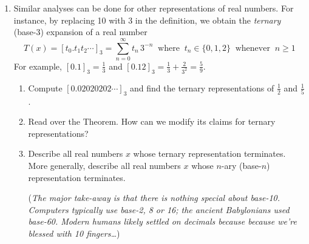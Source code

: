 \begin{exercises*}{}
\begin{enumerate}
		\item Similar analyses can be done for other representations of real numbers. For instance, by replacing 10 with 3 in the definition, we obtain the \emph{ternary} (base-3) expansion of a real number
		\[
			T(x) =[t_0.t_1t_2\cdots]_3
			=\sum_{n=0}^\infty t_n\,3^{-n}
			\ \text{ where }\ 
			t_n\in\{0,1,2\}
			\ \text{ whenever }\
			n\ge 1
		\]
		For example, $[0.1]_3=\frac 13$ and $[0.12]_3=\frac 13+\frac 2{3^2}=\frac 59$.
		\begin{enumerate}
	  	\item Compute $[0.02020202\cdots]_3$ and find the ternary representations of $\frac 12$ and $\frac 15$.
	  	\item Read over the Theorem. How can we modify its claims for ternary representations?
	  	\item Describe all real numbers $x$ whose ternary representation terminates. More generally, describe all real numbers $x$ whose $n$-ary (base-$n$) representation terminates.\par
	  	(\emph{The major take-away is that there is nothing special about base-10. Computers typically use base-2, 8 or 16; the ancient Babylonians used base-60. Modern humans likely settled on decimals because because we're blessed with 10 fingers\ldots})
		\end{enumerate}
	\end{enumerate}
\end{exercises*}

